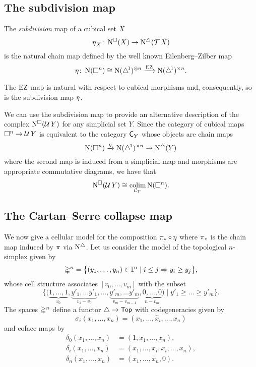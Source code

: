 \subsection{The subdivision map}

The \textit{subdivision} map of a cubical set $X$
\[
\operatorname{\eta}_X \colon \operatorname{N^{\square}}(X) \to \operatorname{N^{\triangle}}(\operatorname{\mathcal{T}} X)
\]
is the natural chain map defined by the well known Eilenberg--Zilber map
\[
\operatorname{\eta} \colon \operatorname{N}(\square^n) \cong \operatorname{N}(\triangle^{\!1})^{\otimes n} \xrightarrow{\operatorname{EZ}} \operatorname{N} (\triangle^{\!1})^{\times n}.
\]

The $\operatorname{EZ}$ map is natural with respect to cubical morphisms and, consequently, so is the subdivision map $\operatorname{\eta}$.

We can use the subdivision map to provide an alternative description of the complex $\operatorname{N^{\square}}(\operatorname{\mathcal{U}} Y)$ for any simplicial set $Y$.
Since the category of cubical maps $\square^n \to \operatorname{\mathcal{U}} Y$ is equivalent to the category $\mathsf{C}_Y$ whose objects are chain maps
\[
\operatorname{N}(\square^n) \xrightarrow{\operatorname{\eta}} \operatorname{N} (\triangle^{\!1})^{\times n} \to \operatorname{N^{\triangle}}(Y)
\]
where the second map is induced from a simplicial map
and morphisms are appropriate commutative diagrams, we have that
\begin{equation} \label{e:alternative description of NUY}
\operatorname{N^{\square}}(\operatorname{\mathcal{U}} Y) \cong \operatorname*{colim}_{\mathcal{C}_Y} \operatorname{N}(\square^n).
\end{equation}

\subsection{The Cartan--Serre collapse map} \label{ss:cs collapse map}

We now give a cellular model for the composition $\operatorname{\pi}_\ast \circ \operatorname{\eta}$ where $\operatorname{\pi}_\ast$ is the chain map induced by $\operatorname{\pi}$ via $\operatorname{N^{\triangle}}$.
Let us consider the model of the topological $n$-simplex given by
\[
\mathbb{\Delta}^n = \big\{ (y_1, \dots, y_n) \in \mathbb{I}^n \mid i \leq j \Rightarrow y_i \geq y_j \big\},
\]
whose cell structure associates $[v_0, \dots, v_m]$ with the subset
\[
\Big\{ \big( \underbrace{1, \dots, 1}_{v_0}, \underbrace{y'_1, \dots y'_1}_{v_1-v_0}, \dots, \underbrace{y'_m, \dots y'_m}_{v_m-v_{m-1}}, \underbrace{0, \dots, 0}_{n-v_m} \big) \mid y'_1 \geq \dots \geq y'_m \Big\}.
\]
The spaces $\mathbb{\Delta}^n$ define a functor $\triangle \to \mathsf{Top}$ with codegeneracies given by
\[
\sigma_i(x_1, \dots, x_n) = (x_1, \dots, \widehat x_i, \dots, x_n)
\]
and coface maps by
\begin{align*}
\delta_0(x_1, \dots, x_n) &= (1, x_1, \dots, x_n), \\
\delta_i(x_1, \dots, x_n) &= (x_1, \dots, x_i, x_i, \dots, x_n), \\
\delta_n(x_1, \dots, x_n) &= (x_1, \dots, x_n, 0).
\end{align*}


